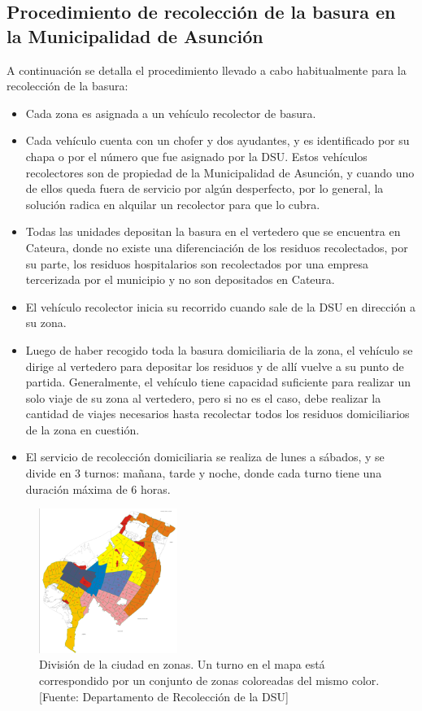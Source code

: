 \subsection{Procedimiento de recolección de la basura en la Municipalidad de Asunción}

A continuación se detalla el procedimiento llevado a cabo habitualmente para la recolección de la basura:

\begin{itemize}
\item Cada zona es asignada a un vehículo recolector de basura.
\item Cada vehículo cuenta con un chofer y dos ayudantes, y es identificado por su chapa o por el número que fue asignado por la DSU. Estos vehículos recolectores son de propiedad de la Municipalidad de Asunción, y cuando uno de ellos queda fuera de servicio por algún desperfecto, por lo general, la solución radica en alquilar un recolector para que lo cubra.
\item Todas las unidades depositan la basura en el vertedero que se encuentra en Cateura, donde no existe una diferenciación de los residuos recolectados, por su parte, los residuos hospitalarios son recolectados por una empresa tercerizada por el municipio y no son depositados en Cateura.
\item El vehículo recolector inicia su recorrido cuando sale de la DSU en dirección a su zona.
\item Luego de haber recogido toda la basura domiciliaria de la zona, el vehículo se dirige al vertedero para depositar los residuos y de allí vuelve a su punto de partida. Generalmente, el vehículo tiene capacidad suficiente para realizar un solo viaje de su zona al vertedero, pero si no es el caso, debe realizar la cantidad de viajes necesarios hasta recolectar todos los residuos domiciliarios de la zona en cuestión.
\item El servicio de recolección domiciliaria se realiza de lunes a sábados, y se divide en 3 turnos: mañana, tarde y noche, donde cada turno tiene una duración máxima de 6 horas.
\end{itemize}

\begin{figure}[H]
    \centering
    \includegraphics[width=4.5cm]{Recoleccion-ZONAS&CUADRANTES.png}
    \caption{División de la ciudad en zonas. Un turno en el mapa está correspondido por un conjunto de zonas coloreadas del mismo color. [Fuente: Departamento de Recolección de la DSU]}
    \label{fig:zonasRecoleccion}
\end{figure}

